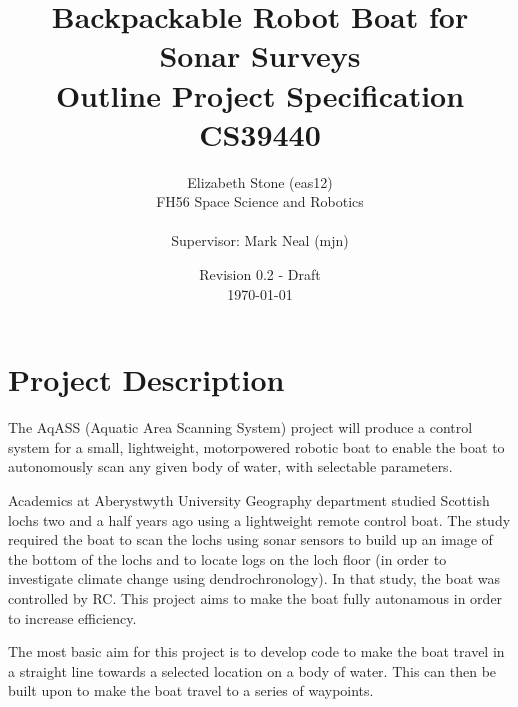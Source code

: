 \documentclass[titlepage 12pt]{article}
\title{Backpackable Robot Boat for Sonar Surveys\\ Outline Project Specification\\ CS39440}
\author{ Elizabeth Stone (eas12)\\FH56 Space Science and Robotics\\ \\Supervisor: Mark Neal (mjn) }
\date{Revision 0.2 - Draft\\ \today\vspace{-3em} }
\begin{document}
{
\selectfont


\begin{titlepage}
	\clearpage\maketitle
\thispagestyle{empty}
	 \vspace{250pt}

	
\end{titlepage}





\section{Project Description}

The AqASS (Aquatic Area Scanning System) project will produce a control system for a small, lightweight, motorpowered robotic boat to enable the boat to autonomously scan any given body of water, with selectable parameters. 

Academics at Aberystwyth University Geography department studied Scottish lochs two and a half years ago using a  lightweight remote control boat. The study required the boat to scan the lochs using sonar sensors to build up an image of the bottom of the lochs and to locate logs on the loch floor (in order to investigate climate change using dendrochronology)\cite{rbates14}. In that study, the boat was controlled by RC. This project aims to make the boat fully autonamous in order to increase efficiency.

The most basic aim for this project is to develop code to make the boat travel in a straight line towards a selected location on a body of water. This can then be built upon to make the boat travel to a series of waypoints.

}
\end{document}
